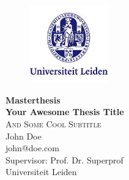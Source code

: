 \thispagestyle{empty}
\begin{titlepage}

\begin{figure}
\begin{flushright}
 \includegraphics[width=0.3\textwidth]{./Images/200px-Seal_Leiden_University.jpg}
 \end{flushright}
\end{figure}

\begin{flushleft} 
{\small \textsf{\textbf{Masterthesis}}} \\[0.5cm]
{\Huge \textsf{\textbf{Your Awesome Thesis Title}}} \\[0.0cm]
{\Large \textsc{And Some Cool Subtitle}} \\[1cm]
 
John Doe\\
john@doe.com\\[1cm]

\color{gray}Supervisor: Prof. Dr. Superprof\\
\color{gray}Universiteit Leiden\\[1cm]

\vfill 
\end{flushleft}
 
\end{titlepage}
